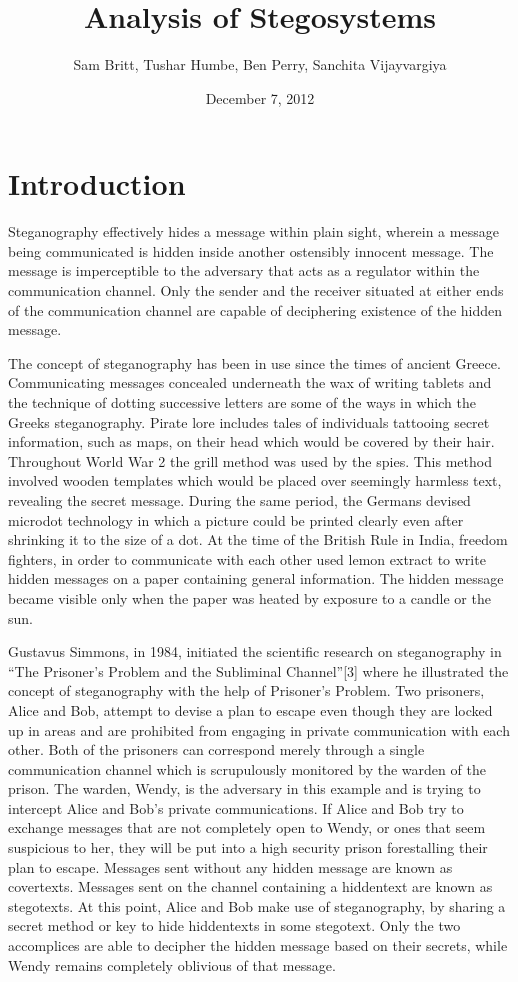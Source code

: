 \documentclass[11pt]{article}
\title{Analysis of Stegosystems}
\author{Sam Britt, Tushar Humbe, Ben Perry, Sanchita Vijayvargiya}
\date{December 7, 2012}
\begin{document}
\maketitle

\section{Introduction}
Steganography effectively hides a message within plain sight, wherein
a message being communicated is hidden inside another ostensibly
innocent message. The message is imperceptible to the adversary that
acts as a regulator within the communication channel. Only the sender
and the receiver situated at either ends of the communication channel
are capable of deciphering existence of the hidden message.

The concept of steganography has been in use since the times of
ancient Greece. Communicating messages concealed underneath the wax of
writing tablets and the technique of dotting successive letters are
some of the ways in which the Greeks steganography. Pirate lore
includes tales of individuals tattooing secret information, such as
maps, on their head which would be covered by their hair. Throughout
World War 2 the grill method was used by the spies. This method
involved wooden templates which would be placed over seemingly
harmless text, revealing the secret message. During the same period,
the Germans devised microdot technology in which a picture could be
printed clearly even after shrinking it to the size of a dot.  At the
time of the British Rule in India, freedom fighters, in order to
communicate with each other used lemon extract to write hidden
messages on a paper containing general information. The hidden message
became visible only when the paper was heated by exposure to a candle
or the sun.

Gustavus Simmons, in 1984, initiated the scientific research on
steganography in ``The Prisoner's Problem and the Subliminal
Channel''[3] where he illustrated the concept of steganography with the
help of Prisoner's Problem. Two prisoners, Alice and Bob, attempt to
devise a plan to escape even though they are locked up in areas and
are prohibited from engaging in private communication with each other.
Both of the prisoners can correspond merely through a single
communication channel which is scrupulously monitored by the warden of
the prison. The warden, Wendy, is the adversary in this example and is
trying to intercept Alice and Bob's private communications. If Alice
and Bob try to exchange messages that are not completely open to
Wendy, or ones that seem suspicious to her, they will be put into a
high security prison forestalling their plan to escape. Messages sent
without any hidden message are known as covertexts. Messages sent on
the channel containing a hiddentext are known as stegotexts. At this
point, Alice and Bob make use of steganography, by sharing a secret
method or key to hide hiddentexts in some stegotext. Only the two
accomplices are able to decipher the hidden message based on their
secrets, while Wendy remains completely oblivious of that message.
\end{document}

